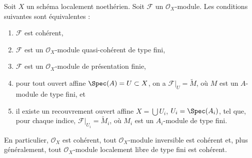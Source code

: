 \begin{lemma}
\label{lemma-coherent-Noetherian}
Soit $X$ un schéma localement noethérien.
Soit $\mathcal{F}$ un $\mathcal{O}_X$-module.
Les conditions suivantes sont équivalentes :
\begin{enumerate}
\item $\mathcal{F}$ est cohérent,
\item $\mathcal{F}$ est un $\mathcal{O}_X$-module quasi-cohérent de type fini,
\item $\mathcal{F}$ est un $\mathcal{O}_X$-module de présentation finie,
\item pour tout ouvert affine $\Spec(A) = U \subset X$, on a
$\mathcal{F}|_U = \widetilde M$, où $M$ est un $A$-module de type fini, et
\item il existe un recouvrement ouvert affine $X = \bigcup U_i$,
$U_i = \Spec(A_i)$, tel que, pour chaque indice,
$\mathcal{F}|_{U_i} = \widetilde M_i$, où $M_i$ est un $A_i$-module de type fini.
\end{enumerate}
En particulier, $\mathcal{O}_X$ est cohérent, tout
$\mathcal{O}_X$-module inversible est cohérent et, plus généralement, tout
$\mathcal{O}_X$-module localement libre de type fini est cohérent.
\end{lemma}

